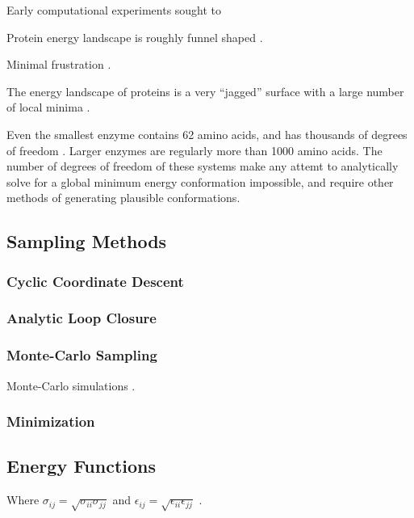 Early computational experiments sought to 

Protein energy landscape is roughly funnel shaped \cite{leopold1992protein}.

Minimal frustration \cite{bryngelson1987spin}.

The energy landscape of proteins is a very ``jagged'' surface with a large number of local minima \cite{tsai1999folding}.

Even the smallest enzyme contains 62 amino acids, and has thousands of degrees of freedom \cite{chen19924}.
Larger enzymes are regularly more than 1000 amino acids.
The number of degrees of freedom of these systems make any attemt to analytically solve for a global minimum energy conformation impossible, and require other methods of generating plausible conformations.

\subsection{Sampling Methods}
\label{subsection:sampling_methods}

\subsubsection{Cyclic Coordinate Descent}
\label{subsubsection:}

\subsubsection{Analytic Loop Closure}
\label{subsubsection:analytic_loop_closure}

\subsubsection{Monte-Carlo Sampling}
\label{subsubsection:monte_carlo}
Monte-Carlo simulations \cite{li1987monte}.

\subsubsection{Minimization}
\label{subsubsection:minimiation}


\subsection{Energy Functions}
\label{subsection:energy_functions}







Where $\sigma_{ij} = \sqrt{\sigma_{ii} \sigma_{jj}}$ and $\epsilon_{ij} = \sqrt{\epsilon_{ii}\epsilon_{jj}}$ \cite{jorgensen1996development}.
